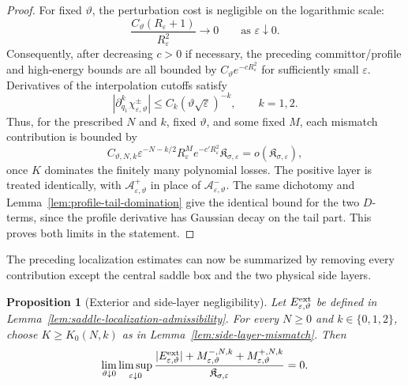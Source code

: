 \documentclass[11pt]{article}
\numberwithin{equation}{section}
\theoremstyle{plain}
\newtheorem{proposition}[theorem]{Proposition}
\theoremstyle{definition}
\theoremstyle{remark}
\newcommand{\eps}{\varepsilon}
\begin{document}
\begin{proof}
For fixed $\vartheta$, the perturbation cost is negligible on the logarithmic
scale:
\[
\frac{C_\vartheta(R_\eps+1)}{R_\eps^2}\longrightarrow0
\qquad\text{as $\eps\downarrow0$}.
\]
Consequently, after decreasing $c>0$ if necessary, the preceding
committor/profile and high-energy bounds are all bounded by
$C_\vartheta e^{-cR_\eps^2}$ for sufficiently small $\eps$.  Derivatives of the
interpolation cutoffs satisfy
\[
|\partial_{q_1}^k\chi_{\eps,\vartheta}^{\pm}|
\le C_k(\vartheta\sqrt\eps)^{-k},
\qquad k=1,2.
\]
Thus, for the prescribed $N$ and $k$, fixed $\vartheta$, and some fixed $M$,
each mismatch contribution is
bounded by
\[
C_{\vartheta,N,k}\eps^{-N-k/2}R_\eps^M e^{-c'R_\eps^2}
\mathfrak K_{\sigma,\eps}=o(\mathfrak K_{\sigma,\eps}),
\]
once $K$ dominates the finitely many polynomial losses.  The positive layer
is treated identically, with
$\mathcal A_{\eps,\vartheta}^+$ in place of
$\mathcal A_{\eps,\vartheta}^-$.  The same dichotomy and
Lemma~\ref{lem:profile-tail-domination} give the identical bound for the two
$D$-terms, since the profile derivative has Gaussian decay on the tail part.
This proves both limits in the statement.
\end{proof}


The preceding localization estimates can now be summarized by
removing every contribution except the central saddle box and the two
physical side layers.

\begin{proposition}[Exterior and side-layer negligibility]
\label{prop:cutoff-side-exterior-negligibility}
Let $E_{\eps,\vartheta}^{\rm ext}$ be defined in
Lemma~\ref{lem:saddle-localization-admissibility}.  For every $N\ge0$ and
$k\in\{0,1,2\}$, choose $K\ge K_0(N,k)$ as in
Lemma~\ref{lem:side-layer-mismatch}.  Then
\[
\lim_{\vartheta\downarrow0}\limsup_{\eps\downarrow0}
\frac{
|E_{\eps,\vartheta}^{\rm ext}|
+M_{\eps,\vartheta}^{-,N,k}
+M_{\eps,\vartheta}^{+,N,k}}
{\mathfrak K_{\sigma,\eps}}=0.
\]
\end{proposition}
\end{document}
